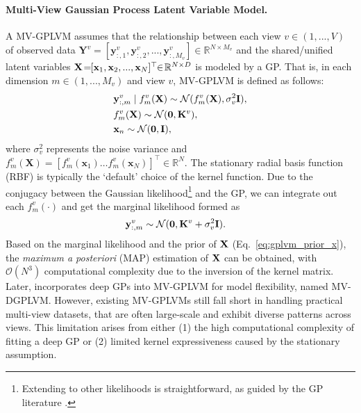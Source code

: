 \paragraph{Multi-View Gaussian Process Latent Variable Model.} 
A MV-GPLVM assumes that the relationship between each view $v \! \in \! (1, ..., V)$ of observed data $\mathbf{Y}^{v} \!=\! [\mathbf{y}_{:, 1}^{v}, \mathbf{y}_{:, 2}^{v}, ..., \mathbf{y}_{:, M_v}^{v}]\!\in\!\mathbb{R}^{N \times M_v}$ and the shared/unified latent variables $\mathbf{X} \!=\!\! [{\mathbf x}_1, {\mathbf x}_2, ..., {\mathbf x}_N]^\top \!\!\in \! \mathbb{R}^{N \times D}$ is modeled by a GP. That is, in each dimension $m \!\in\! (1, ..., M_v)$ and view $v$, MV-GPLVM is defined as follows:
\begin{subequations}
\label{eq:gplvm}
\begin{align}
    \setlength{\abovedisplayskip}{4.5pt}
    \setlength{\belowdisplayskip}{4.5pt}
        & \y_{:, m}^{v} \mid f_m^{v}(\vx)  \sim \mathcal{N}( f_m^{v}(\vx), \sigma^{2}_{v} \vi),  \\ 
        & f_m^{v}(\vx) \sim \mathcal{N}(\mathbf{0}, \mathbf{K}^{v}),  \\ 
        & \x_n \sim  \mathcal{N}(\mathbf{0}, \mathbf{I}),  \label{eq:gplvm_prior_x} 
\end{align}
\end{subequations}
where $\sigma_v^{2}$ represents the noise variance and $f_m^{v}(\mathbf{X})\!=\!\left[f_m^{v} \left(\mathbf{x}_1\right) \ldots f_m^{v}\left(\mathbf{x}_N\right)\right]^{\top}\!\in\!\mathbb{R}^{N}$. The stationary radial basis function (\MakeUppercase{rbf}) is  typically the `default' choice of the kernel function. Due to the conjugacy between the Gaussian likelihood\footnote{Extending to other likelihoods is straightforward, as guided by the GP literature \citep{zhang2023bayesian,lalchand2022generalised}.} and the GP, we can integrate out each $f^{v}_m(\cdot)$ and get the marginal likelihood formed as
\begin{align}
    &{\mathbf y}_{:, m}^{v}\sim \mathcal{N} (\boldsymbol 0, \mathbf{K}^{v} + \sigma^2_v \mathbf{I}). 
    \label{eq:gplvm_mle}
\end{align}
Based on the marginal likelihood and the prior of ${\mathbf X}$ (Eq.~\eqref{eq:gplvm_prior_x}),  the \textit{maximum a posteriori} (MAP) estimation of ${\mathbf X}$ can be obtained, with $\mathcal{O}(N^3)$ computational complexity due to the inversion of the kernel matrix.  Later, \citet{sun2020multi} incorporates deep GPs \citep{damianou2013deep} into MV-GPLVM for model flexibility, named MV-DGPLVM. However, existing MV-GPLVMs still fall short in handling practical multi-view datasets, that are often large-scale and exhibit diverse patterns across views. This limitation arises from either (1) the high computational complexity of fitting a deep GP or (2) limited kernel expressiveness caused by the stationary assumption. 

